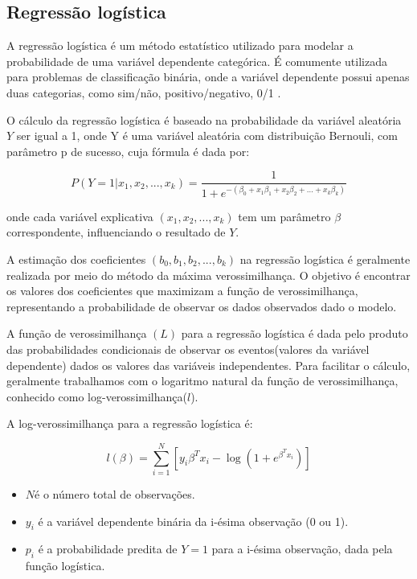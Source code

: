 
 \subsection{Regressão logística}
 A regressão logística é um método estatístico utilizado para modelar a probabilidade de uma variável 
dependente categórica. É comumente utilizada para problemas de classificação binária, onde a variável
dependente possui apenas duas categorias, como sim/não, positivo/negativo, 0/1 \cite{hosmer}.


O cálculo da regressão logística é baseado na probabilidade da variável aleatória $Y$ ser igual a 1, onde Y é 
uma variável aleatória com distribuição Bernouli, com parâmetro p de sucesso, cuja fórmula é dada por:

\begin{equation}
  P(Y=1| x_1, x_2, ..., x_k) = \frac{1}{1 + e^{-(\beta_0 + x_{1}\beta_1 + x_{2}\beta_2 + \ldots + x_{k}\beta_k)}}
  \label{eq:model_logistic}
\end{equation}

\noindent onde cada variável explicativa $(x_1, x_2, ..., x_k)$ tem um parâmetro $\beta$ correspondente, influenciando o resultado de $Y$.

A estimação dos coeficientes $(b_0, b_1, b_2, ..., b_k)$  na regressão logística é geralmente realizada por meio 
do método da máxima verossimilhança. O objetivo é encontrar os valores dos coeficientes que maximizam a função de
verossimilhança, representando a probabilidade de observar os dados observados dado o modelo.
 
A função de verossimilhança $(L)$ para a regressão logística é dada pelo produto das probabilidades condicionais
de observar os eventos(valores da variável dependente) dados os valores das variáveis independentes. Para facilitar o cálculo, 
geralmente trabalhamos com o logaritmo natural da função de verossimilhança, conhecido como log-verossimilhança($l$).

A log-verossimilhança para a regressão logística é:

\begin{equation}
  l(\beta) = \sum_{i=1}^{N} [y_i \beta^T x_i - \log(1 + e^{\beta^T x_i})]
\end{equation}


\begin{itemize}
  \item  $N$é o número total de observações.
  \item  $y_i$ é a variável dependente binária da i-ésima observação (0 ou 1).
  \item $p_i$ é a probabilidade predita de $Y=1$ para a i-ésima observação, dada pela função logística.
\end{itemize}

